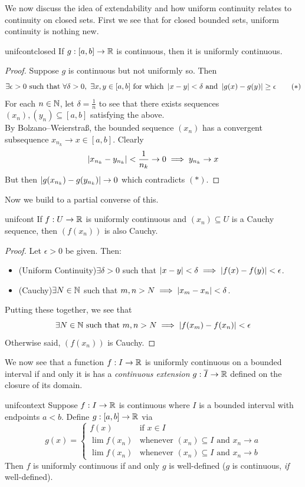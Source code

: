 We now discuss the idea of extendability and how uniform continuity relates to continuity on closed sets. First we see that for closed bounded sets, uniform continuity is nothing new.

\begin{thm}{}{unifcontclosed}
If $g:[a,b]\to\mathbb{R}$ is continuous, then it is uniformly continuous. 
\end{thm}

\begin{proof}
Suppose $g$ is continuous but not uniformly so. Then
\[\exists \epsilon>0\text{ such that }\forall\delta>0,\ \exists x,y\in [a,b]\text{ for which }\left| x-y\right|<\delta\text{ and }\left| g(x)-g(y)\right|\ge\epsilon \tag{$\ast$}\]
For each $n\in\mathbb{N}$, let $\delta=\frac 1n$ to see that there exists sequences $(x_n),(y_n)\subseteq[a,b]$ satisfying the above.\\
By Bolzano--Weierstraß, the bounded sequence $(x_n)$ has a convergent subsequence $x_{n_k}\to x\in[a,b]$. Clearly
\[\left| x_{n_k}-y_{n_k}\right|<\frac 1{n_k}\to 0\implies y_{n_k}\to x\]
But then $\left| g(x_{n_k})-g(y_{n_k})\right|\to 0$ which contradicts $(\ast)$.
\end{proof}

Now we build to a partial converse of this.

\begin{lemm}{}{unifcont}
If $f:U\to\mathbb{R}$ is uniformly continuous and $(x_n)\subseteq U$ is a Cauchy sequence, then $(f(x_n))$ is also Cauchy.
\end{lemm}

\begin{proof}
Let $\epsilon>0$ be given. Then:
\begin{itemize}
  \item (Uniform Continuity)\quad $\exists\delta>0$ such that $\left| x-y\right|<\delta\implies \left| f(x)-f(y)\right|<\epsilon$.
  \item (Cauchy)\quad $\exists N\in\mathbb{N}$ such that $m,n>N\implies \left| x_m-x_n\right|<\delta$.
\end{itemize}
Putting these together, we see that
\[\exists N\in\mathbb{N}\text{ such that }m,n>N\implies \left| f(x_m)-f(x_n)\right|<\epsilon\]
Otherwise said, $(f(x_n))$ is Cauchy.
\end{proof}
\goodbreak

We now see that a function $f:I\to \mathbb{R}$ is uniformly continuous on a bounded interval if and only it is has a \emph{continuous extension} $g:\overline{I}\to\mathbb{R}$ defined on the closure of its domain.

\begin{thm}{}{unifcontext}
Suppose $f:I\to\mathbb{R}$ is continuous where $I$ is a bounded interval with endpoints $a<b$. Define $g:[a,b]\to\mathbb{R}$ via
  \[g(x)=\begin{cases}
  f(x)&\text{if }x\in I\\
  \lim f(x_n)&\text{whenever }(x_n)\subseteq I\text{ and }x_n\to a\\
  \lim f(x_n)&\text{whenever }(x_n)\subseteq I\text{ and }x_n\to b
  \end{cases}\]
  Then $f$ is uniformly continuous if and only $g$ is well-defined ($g$ is continuous, \emph{if} well-defined).
\end{thm}\goodbreak

